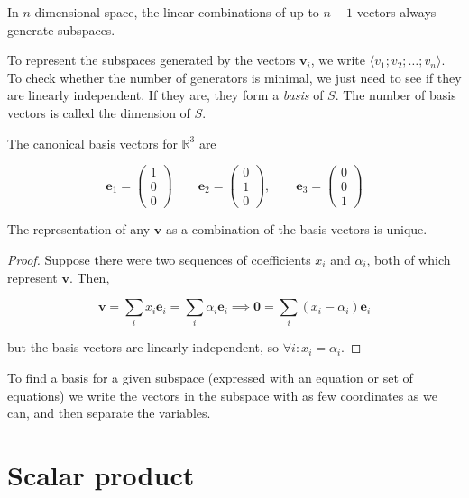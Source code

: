 \documentclass[12pt,a4paper]{report}
\numberwithin{equation}{section}
\theoremstyle{definition}
\theoremstyle{remark}
\begin{document}
In $n$-dimensional space, the linear combinations of up to $n-1$ vectors always generate subspaces.

To represent the subspaces generated by the vectors $\mathbf{v}_i$, we write $\langle v_1; v_2; \dots ; v_n\rangle$. To check whether the number of generators is minimal, we just need to see if they are linearly independent. If they are, they form a \emph{basis} of $S$. The number of basis vectors is called the dimension of $S$.

The canonical basis vectors for $\mathbb{R}^3$ are 

\begin{equation}
\mathbf{e}_1 = \begin{pmatrix}
1\\0\\0
\end{pmatrix} \qquad \mathbf{e}_2 = \begin{pmatrix}
0\\1\\0
\end{pmatrix},\qquad \mathbf{e}_3 = \begin{pmatrix}
0\\0\\1
\end{pmatrix}
\end{equation}

The representation of any $\mathbf{v}$ as a combination of the basis vectors is unique.

\begin{proof}
Suppose there were two sequences of coefficients $x_i$ and $\alpha_i$, both of which represent $\mathbf{v}$. Then,

\begin{equation}
\mathbf{v} = \sum_i x_i \mathbf{e}_i = \sum_i \alpha_i \mathbf{e}_i \implies \mathbf{0} = \sum_i (x_i - \alpha_i) \mathbf{e}_i
\end{equation}

but the basis vectors are linearly independent, so $\forall i: x_i = \alpha_i$.
\end{proof}

To find a basis for a given subspace (expressed with an equation or set of equations) we write the vectors in the subspace with as few coordinates as we can, and then separate the variables.

\section{Scalar product}
\end{document}
